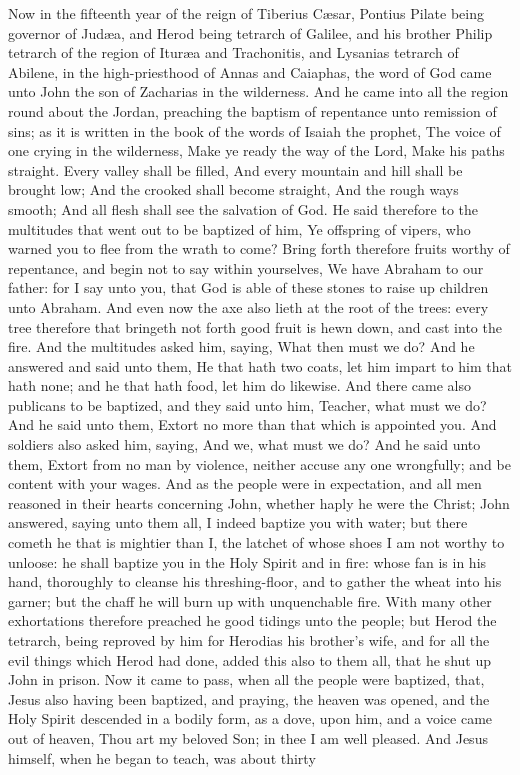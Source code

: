 Now in the fifteenth year of the reign of Tiberius Cæsar, Pontius Pilate being governor of Judæa, and Herod being tetrarch of Galilee, and his brother Philip tetrarch of the region of Ituræa and Trachonitis, and Lysanias tetrarch of Abilene, in the high-priesthood of Annas and Caiaphas, the word of God came unto John the son of Zacharias in the wilderness. And he came into all the region round about the Jordan, preaching the baptism of repentance unto remission of sins; as it is written in the book of the words of Isaiah the prophet, The voice of one crying in the wilderness, Make ye ready the way of the Lord, Make his paths straight.  Every valley shall be filled, And every mountain and hill shall be brought low; And the crooked shall become straight, And the rough ways smooth;  And all flesh shall see the salvation of God.  He said therefore to the multitudes that went out to be baptized of him, Ye offspring of vipers, who warned you to flee from the wrath to come? Bring forth therefore fruits worthy of repentance, and begin not to say within yourselves, We have Abraham to our father: for I say unto you, that God is able of these stones to raise up children unto Abraham. And even now the axe also lieth at the root of the trees: every tree therefore that bringeth not forth good fruit is hewn down, and cast into the fire. And the multitudes asked him, saying, What then must we do? And he answered and said unto them, He that hath two coats, let him impart to him that hath none; and he that hath food, let him do likewise. And there came also publicans to be baptized, and they said unto him, Teacher, what must we do? And he said unto them, Extort no more than that which is appointed you. And soldiers also asked him, saying, And we, what must we do? And he said unto them, Extort from no man by violence, neither accuse any one wrongfully; and be content with your wages.  And as the people were in expectation, and all men reasoned in their hearts concerning John, whether haply he were the Christ; John answered, saying unto them all, I indeed baptize you with water; but there cometh he that is mightier than I, the latchet of whose shoes I am not worthy to unloose: he shall baptize you in the Holy Spirit and in fire: whose fan is in his hand, thoroughly to cleanse his threshing-floor, and to gather the wheat into his garner; but the chaff he will burn up with unquenchable fire.  With many other exhortations therefore preached he good tidings unto the people; but Herod the tetrarch, being reproved by him for Herodias his brother’s wife, and for all the evil things which Herod had done, added this also to them all, that he shut up John in prison.  Now it came to pass, when all the people were baptized, that, Jesus also having been baptized, and praying, the heaven was opened, and the Holy Spirit descended in a bodily form, as a dove, upon him, and a voice came out of heaven, Thou art my beloved Son; in thee I am well pleased.  And Jesus himself, when he began to teach, was about thirty 